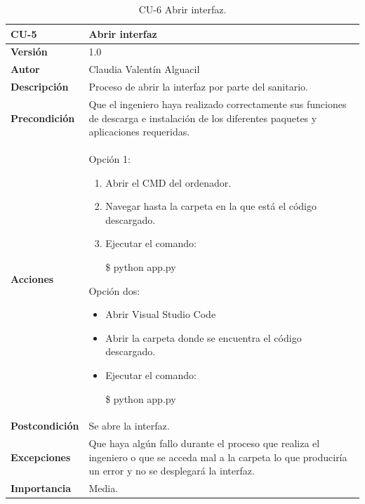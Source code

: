 \begin{table}[p]
	\centering
	\begin{tabularx}{\linewidth}{ p{} p{} }
		\toprule
		\textbf{CU-5}    & \textbf{Abrir interfaz}\\
		\toprule
		\textbf{Versión}              & 1.0    \\
		\textbf{Autor}                & Claudia Valentín Alguacil \\
		
		\textbf{Descripción}          & Proceso de abrir la interfaz por parte del sanitario. \\
		\textbf{Precondición}         & Que el ingeniero haya realizado correctamente sus funciones de descarga e instalación de los diferentes paquetes y aplicaciones requeridas. \\
		\textbf{Acciones}             &
        Opción 1: 
		\begin{enumerate}
			\def\labelenumi{\arabic{enumi}.}
			\tightlist
			\item Abrir el CMD del ordenador.
			\item Navegar hasta la carpeta en la que está el código descargado.
                \item Ejecutar el comando:
                
                \$ python app.py
		\end{enumerate}
        Opción dos:
        \begin{itemize}
        \def\labelenumi{\arabic{enumi}.}
		  \tightlist
            \item Abrir Visual Studio Code
            \item Abrir la carpeta donde se encuentra el código descargado.
            \item Ejecutar el comando:
                
            \$ python app.py
        \end{itemize} \\
		\textbf{Postcondición}        &  Se abre la interfaz. \\
		\textbf{Excepciones}          & Que haya algún fallo durante el proceso que realiza el ingeniero o que se acceda mal a la carpeta lo que produciría un error y no se desplegará la interfaz. \\
		\textbf{Importancia}          & Media. \\
		\bottomrule
	\end{tabularx}
	\caption{CU-6 Abrir interfaz.}
\end{table}

